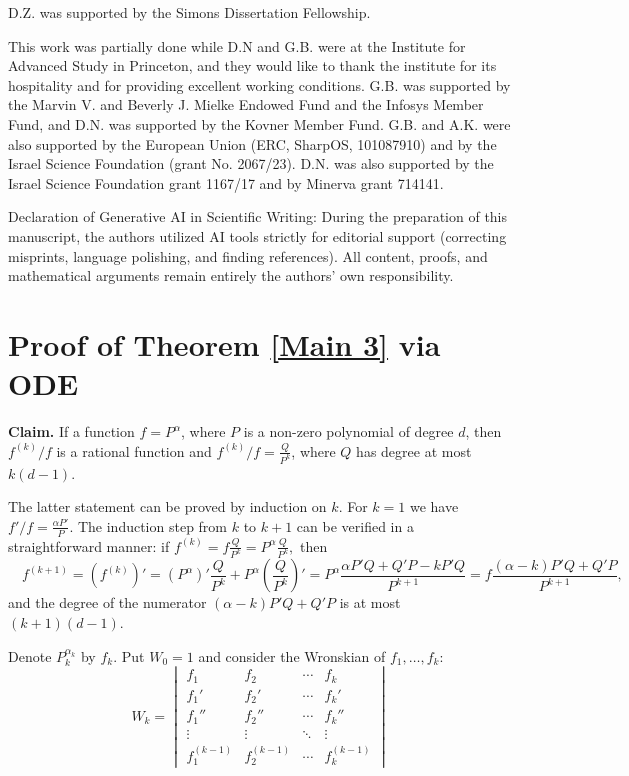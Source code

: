 \documentclass{article}
\begin{document}
D.Z. was supported by the Simons Dissertation Fellowship.

This work was partially done while D.N  and G.B. were at the Institute for Advanced Study in Princeton, and they would like to thank the institute for its hospitality and for providing excellent working conditions. G.B. was supported by the Marvin V. and Beverly J. Mielke Endowed Fund and the Infosys Member Fund, and D.N. was supported by the Kovner Member Fund. G.B. and A.K. were also supported by the European Union (ERC, SharpOS, 101087910) and by the Israel Science Foundation (grant No. 2067/23). D.N. was also supported by the Israel Science Foundation grant 1167/17 and by Minerva grant 714141.

Declaration of Generative AI in Scientific Writing: During the preparation of this manuscript, the authors utilized AI tools strictly for editorial support (correcting misprints, language polishing, and finding references). All content, proofs, and mathematical arguments remain entirely the authors' own responsibility.

\section{Proof of Theorem \ref{Main 3} via ODE}

\textbf{Claim.} If a function $f=P^{\alpha}$, where $P$ is a non-zero polynomial of degree $d$, then
$f^{(k)}/f$ is a rational function and $f^{(k)}/f=\frac{Q}{P^k}$, where $Q$ has degree at most $k(d-1)$.

The latter statement can be proved by induction on $k$. For $k=1$ we have $f'/f= \frac{\alpha P'}{P}$.
The induction step from $k$ to $k+1$ can be verified in a straightforward manner: if $f^{(k)}=f \frac{Q}{P^k}= P^\alpha \frac{Q}{P^k},$ then $$ \quad f^{(k+1)}= (f^{(k)})'= (P^\alpha)' \frac{Q}{P^k}+ P^\alpha \left(\frac{Q}{P^k}\right)'= P^\alpha \frac{\alpha P'Q+Q'P-kP'Q}{P^{k+1}}= f \frac{(\alpha-k)P'Q+Q'P}{P^{k+1}},$$
and the degree of the numerator $(\alpha-k)P'Q+Q'P$ is at most $(k+1)(d-1)$.



Denote $P_k^{\alpha_k}$ by $f_k$. Put $W_0=1$ and consider the Wronskian of $f_1,\dots,f_k$:
\begin{equation}
    W_k = \begin{vmatrix}
f_1 & f_2 & \cdots & f_k \\
f_1' & f_2' & \cdots & f_k' \\
f_1'' & f_2'' & \cdots & f_k'' \\
\vdots & \vdots & \ddots & \vdots \\
f_1^{(k-1)} & f_2^{(k-1)} & \cdots & f_k^{(k-1)}
\end{vmatrix}
\end{equation}
\end{document}
